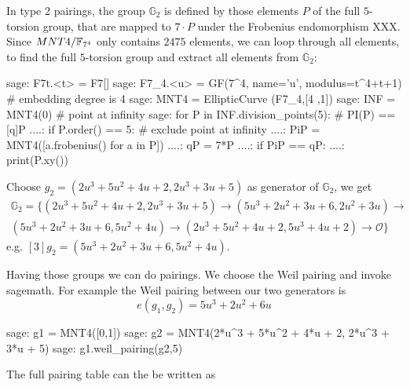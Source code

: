 In type 2 pairings, the group $\mathbb{G}_2$ is defined by those elements $P$ of the full $5$-torsion group, that are mapped to $7\cdot P$ under the Frobenius endomorphism XXX. Since $MNT4/\mathbb{F}_{7^4}$ only contains $2475$ elements, we can  loop through all elements, to find the full $5$-torsion group and extract all elements from $\mathbb{G}_2$:
\begin{sagecommandline}
sage: F7t.<t> = F7[]
sage: F7_4.<u> = GF(7^4, name='u', modulus=t^4+t+1) # embedding degree is 4
sage: MNT4 = EllipticCurve (F7_4,[4 ,1])
sage: INF = MNT4(0) # point at infinity
sage: for P in INF.division_points(5): # PI(P) == [q]P
....:     if P.order() == 5: # exclude point at infinity
....:         PiP = MNT4([a.frobenius() for a in P])
....:         qP = 7*P
....:         if PiP == qP:
....:             print(P.xy())
\end{sagecommandline}

Choose $g_2=(2u^3 + 5u^2 + 4u + 2, 2u^3 + 3u + 5)$ as generator of $\mathbb{G}_2$, we get
\begin{multline*}
\mathbb{G}_2=\{ 
(2u^3 + 5u^2 + 4u + 2, 2u^3 + 3u + 5) \to
(5u^3 + 2u^2 + 3u + 6, 2u^2 + 3u) \to \\
(5u^3 + 2u^2 + 3u + 6, 5u^2 + 4u) \to
(2u^3 + 5u^2 + 4u + 2, 5u^3 + 4u + 2)\to
\mathcal{O}\}
\end{multline*}
e.g. $[3]g_2= (5u^3 + 2u^2 + 3u + 6, 5u^2 + 4u)$.

Having those groups we can do pairings. We choose the Weil pairing and invoke sagemath. For example the Weil pairing between our two generators is
$$
e(g_1,g_2)= 5u^3 + 2u^2 + 6u
$$
\begin{sagecommandline}
sage: g1 = MNT4([0,1])
sage: g2 = MNT4(2*u^3 + 5*u^2 + 4*u + 2, 2*u^3 + 3*u + 5)
sage: g1.weil_pairing(g2,5)
\end{sagecommandline}
The full pairing table can the be written as
\begingroup
    \fontsize{10pt}{10pt}\selectfont
    
    
